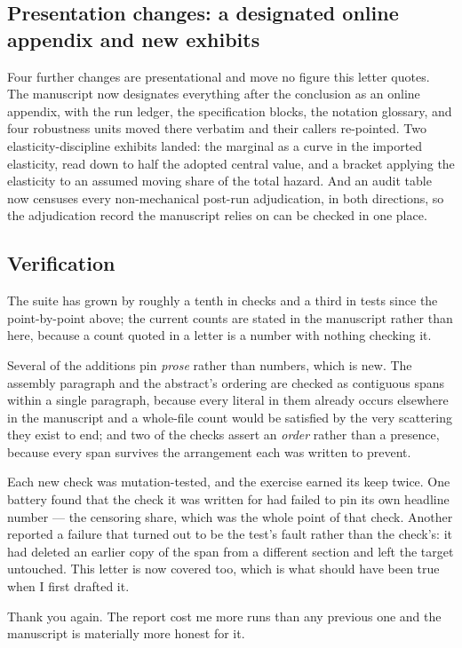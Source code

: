 \documentclass[11pt]{article}
\begin{document}
\subsection{Presentation changes: a designated online appendix and new exhibits}

Four further changes are presentational and move no figure this letter quotes. The
manuscript now designates everything after the conclusion as an online appendix, with
the run ledger, the specification blocks, the notation glossary, and four robustness
units moved there verbatim and their callers re-pointed. Two elasticity-discipline
exhibits landed: the marginal as a curve in the imported elasticity, read down to
half the adopted central value, and a bracket applying the elasticity to an assumed
moving share of the total hazard. And an audit table now censuses every
non-mechanical post-run adjudication, in both directions, so the adjudication record
the manuscript relies on can be checked in one place.

\subsection{Verification}

The suite has grown by roughly a tenth in checks and a third in tests since the
point-by-point above; the current counts are stated in the manuscript rather than
here, because a count quoted in a letter is a number with nothing checking it.

Several of the additions pin \emph{prose} rather than numbers, which is new. The
assembly paragraph and the abstract's ordering are checked as contiguous spans within
a single paragraph, because every literal in them already occurs elsewhere in the
manuscript and a whole-file count would be satisfied by the very scattering they exist
to end; and two of the checks assert an \emph{order} rather than a presence, because
every span survives the arrangement each was written to prevent.

Each new check was mutation-tested, and the exercise earned its keep twice. One
battery found that the check it was written for had failed to pin its own headline
number --- the censoring share, which was the whole point of that check. Another
reported a failure that turned out to be the test's fault rather than the check's: it
had deleted an earlier copy of the span from a different section and left the target
untouched. This letter is now covered too, which is what should have been true when I
first drafted it.

\vspace{1em}
\noindent Thank you again. The report cost me more runs than any previous one and
the manuscript is materially more honest for it.
\end{document}

